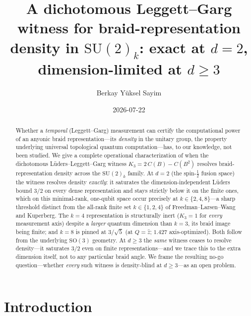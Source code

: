 \documentclass[aps,prx,reprint,amsmath,amssymb,floatfix,nofootinbib,superscriptaddress]{revtex4-2}
\begin{document}
\setcounter{secnumdepth}{3} %

\title{A dichotomous Leggett--Garg witness for braid-representation density in
$\mathrm{SU}(2)_k$: exact at $d=2$, dimension-limited at $d \ge 3$}

\author{Berkay Y\"uksel Sayim}

\date{2026-07-22}

\begin{abstract}
Whether a \emph{temporal} (Leggett--Garg) measurement can certify the computational
power of an anyonic braid representation---its \emph{density} in the unitary group,
the property underlying universal topological quantum computation---has, to our
knowledge, not been studied. We give a complete operational characterization of when the dichotomous
L\"uders--Leggett--Garg witness $K_3 = 2\,C(B) - C(B^2)$ resolves braid-representation
density across the $\mathrm{SU}(2)_k$ family. At $d=2$ (the spin-$\tfrac12$ fusion
space) the witness resolves density \emph{exactly}: it saturates the
dimension-independent L\"uders bound $3/2$ on every dense representation and stays
strictly below it on the finite ones, which on this minimal-rank, one-qubit space
occur precisely at $k \in \{2,4,8\}$---a sharp threshold distinct from the all-rank
finite set $k \in \{1,2,4\}$ of Freedman--Larsen--Wang and Kuperberg. The $k=4$
representation is structurally inert ($K_3 = 1$ for
\emph{every} measurement axis) despite a \emph{larger} quantum dimension than $k=3$,
its braid image being finite; and $k=8$ is pinned at $3/\sqrt5$ (at $Q=\hat z$; $1.427$
axis-optimized). Both follow from the
underlying $\mathrm{SO}(3)$ geometry. At $d \ge 3$ the \emph{same} witness ceases to
resolve density---it saturates $3/2$ even on finite representations---and we trace
this to the extra dimension itself, not to any particular braid angle. We frame the
resulting no-go question---whether \emph{every} such witness is density-blind at
$d \ge 3$---as an open problem.
\end{abstract}

\maketitle

\section{Introduction}
\label{sec:intro}
\end{document}
